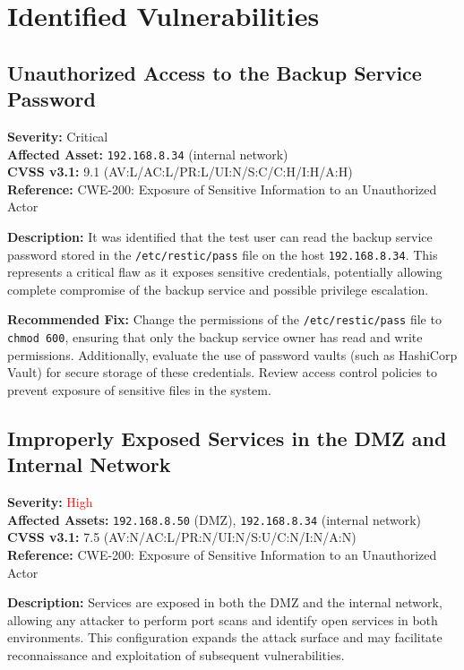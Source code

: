 \documentclass[a4paper,12pt]{article}
\begin{document}
\clearpage

\section{Identified Vulnerabilities}

\subsection{Unauthorized Access to the Backup Service Password}
\textbf{Severity:} \textcolor{BrickRed}{Critical} \\
\textbf{Affected Asset:} \texttt{192.168.8.34} (internal network) \\
\textbf{CVSS v3.1:} 9.1 (AV:L/AC:L/PR:L/UI:N/S:C/C:H/I:H/A:H) \\
\textbf{Reference:} CWE-200: Exposure of Sensitive Information to an Unauthorized Actor

\textbf{Description:}  
It was identified that the test user can read the backup service password stored in the \texttt{/etc/restic/pass} file on the host \texttt{192.168.8.34}. This represents a critical flaw as it exposes sensitive credentials, potentially allowing complete compromise of the backup service and possible privilege escalation.

\textbf{Recommended Fix:}  
Change the permissions of the \texttt{/etc/restic/pass} file to \texttt{chmod 600}, ensuring that only the backup service owner has read and write permissions. Additionally, evaluate the use of password vaults (such as HashiCorp Vault) for secure storage of these credentials. Review access control policies to prevent exposure of sensitive files in the system.

\vspace{1cm}

\subsection{Improperly Exposed Services in the DMZ and Internal Network}
\textbf{Severity:} \textcolor{Red}{High} \\
\textbf{Affected Assets:} \texttt{192.168.8.50} (DMZ), \texttt{192.168.8.34} (internal network) \\
\textbf{CVSS v3.1:} 7.5 (AV:N/AC:L/PR:N/UI:N/S:U/C:N/I:N/A:N) \\
\textbf{Reference:} CWE-200: Exposure of Sensitive Information to an Unauthorized Actor

\textbf{Description:}  
Services are exposed in both the DMZ and the internal network, allowing any attacker to perform port scans and identify open services in both environments. This configuration expands the attack surface and may facilitate reconnaissance and exploitation of subsequent vulnerabilities.
\end{document}
